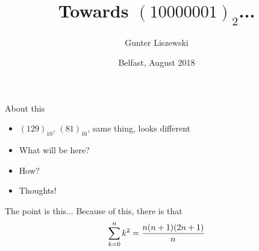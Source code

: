\documentclass[pdf]{beamer}
\title{Towards $(10000001)_2$...}
\author{Gunter Liszewski}
\date{Belfast, August 2018}
\begin{document}
\begin{frame}
  \titlepage
\end{frame}


\begin{frame}{About this}
  \begin{itemize}
    \pause
    \item $(129)_{10}$, $(81)_{16}$, same thing, looks different
    \pause
    \item What will be here?
    \pause
    \item How?
    \pause
    \item Thoughts!
  \end{itemize}
\end{frame}

\begin{frame}{The point is this...}
  Because of this, there is that
$$\sum_{k=0}^{n}{k^2}={n(n+1)(2n+1)\over n}$$
\end{frame}
\end{document}
